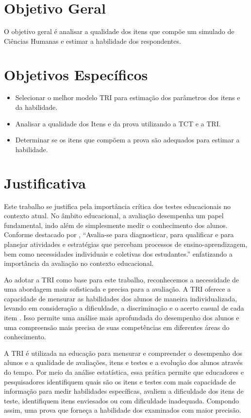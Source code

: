 \section{Objetivo Geral}
\thispagestyle{nocontent}
O objetivo geral é analisar a qualidade dos itens que compõe um simulado de Ciências Humanas e estimar a habilidade dos respondentes.

\section{Objetivos Específicos}

\begin{itemize}
	
	\item Selecionar o melhor modelo TRI para estimação dos parâmetros dos itens e da habilidade.
	\item Analisar a qualidade dos Itens e da prova utilizando a TCT e a TRI. 
	\item Determinar se os itens que compõem a prova são adequados para estimar a habilidade.


\end{itemize}



\section{Justificativa}
\thispagestyle{nocontent}
Este trabalho se justifica pela importância crítica dos testes educacionais no contexto atual. No âmbito educacional, a avaliação desempenha um papel fundamental, indo além de simplesmente medir o conhecimento dos alunos. Conforme destacado por \cite{silva2019}, ``Avalia-se para diagnosticar, para qualificar e para planejar atividades e estratégias que percebam processos de ensino-aprendizagem, bem como necessidades individuais e coletivas dos estudantes.'' enfatizando a importância da avaliação no contexto educacional.

Ao adotar a TRI como base para este trabalho, reconhecemos a necessidade de uma abordagem mais sofisticada e precisa para a avaliação. A TRI oferece a capacidade de mensurar as habilidades dos alunos de maneira individualizada, levando em consideração a dificuldade, a discriminação e o acerto casual de cada item \cite{pasquali2018}. Isso permite uma análise mais aprofundada do desempenho dos alunos e uma compreensão mais precisa de suas competências em diferentes áreas do conhecimento.

A TRI é utilizada na educação para mensurar e compreender o desempenho dos alunos e a qualidade de avaliações, itens e testes e a evolução dos alunos através do tempo. Por meio da análise estatística, essa prática permite que educadores e pesquisadores identifiquem quais são os itens e testes com mais capacidade de informação para medir habilidades específicas, avaliem a dificuldade dos itens de teste, identifiquem itens enviesados ou com dificuldade inadequada. Compondo assim, uma prova que forneça a habilidade dos examinados com maior precisão.

